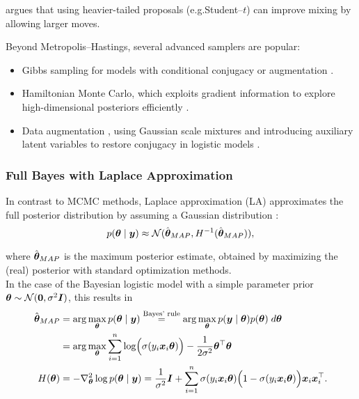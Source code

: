 \citep{scott_data_2011} argues that using heavier-tailed proposals (e.g.\@ Student–$t$) can improve mixing by allowing larger moves.\\

Beyond Metropolis–Hastings, several advanced samplers are popular:

\begin{itemize}
    \item Gibbs sampling for models with conditional conjugacy or augmentation \citep{dellaportas_bayesian_1993}.
    \item Hamiltonian Monte Carlo, which exploits gradient information to explore high-dimensional posteriors efficiently \citep{neal_probabilistic_1993}.
    \item Data augmentation \citep{albert_bayesian_1993}, using Gaussian scale mixtures and introducing auxiliary latent variables to restore conjugacy in logistic models \citep{holmes_efficient_nodate,fruhwirth-schnatter_auxiliary_2007,scott_data_2011}.
\end{itemize}

\subsubsection*{Full Bayes with Laplace Approximation}

In contrast to MCMC methods, Laplace approximation (LA) approximates the full posterior distribution by assuming a Gaussian distribution \citep{tierney_accurate_1986}:
\begin{equation*}
    p(\bm{\theta} \mid \bm{y}) \approx \mathcal{N}(\hat{\bm{\theta}}_{MAP}, H^{-1}(\hat{\bm{\theta}}_{MAP})),
\end{equation*}

where $\hat{\bm{\theta}}_{MAP}$ is the maximum posterior estimate, obtained by maximizing the (real) posterior with standard optimization methods.\\

In the case of the Bayesian logistic model with a simple parameter prior $\bm{\theta} \sim \mathcal{N}(\bm{0}, \sigma^2 \bm{I})$, this results in
\begin{equation*}
    \begin{aligned}
        \hat{\bm{\theta}}_{MAP} &= \arg \max_{\bm{\theta}} p(\bm{\theta} \mid \bm{y})
            \overset{\text{Bayes' rule}}{=} \arg \max_{\bm{\theta}} p(\bm{y} \mid \bm{\theta}) p(\bm{\theta}) \; d\bm{\theta}  \\
            &= \arg \max_{\bm{\theta}} \sum_{i = 1}^n \log \Bigl( \sigma(y_i \bm{x}_i\bm{\theta})\Bigr) - \frac{1}{2 \sigma^2} \bm{\theta}^\top \bm{\theta} \\
        H(\bm{\theta}) &= - \nabla^2_{\bm{\theta}}  \log p (\bm{\theta} \mid \bm{y}) = \frac{1}{\sigma^2} \bm{I} + \sum_{i = 1}^n
        \sigma(y_i \bm{x}_i\bm{\theta}) \Bigl(1 - \sigma(y_i \bm{x}_i\bm{\theta})\Bigr)
            \bm{x}_i \bm{x}_i^\top.
    \end{aligned}
\end{equation*}

